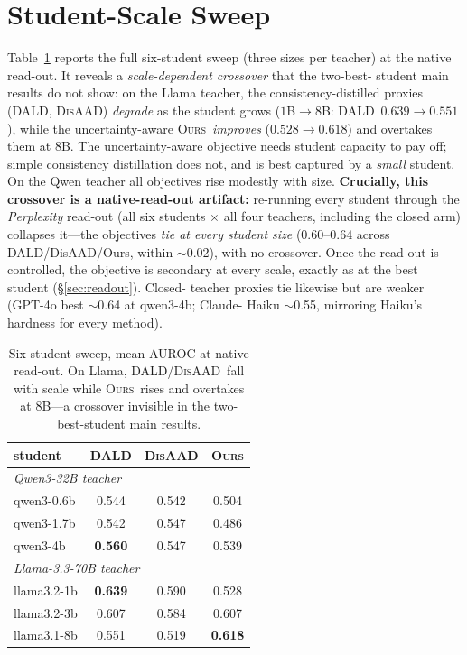 \documentclass[11pt]{article}
\newcommand{\ours}{\textsc{Ours}}
\newcommand{\dald}{\textsc{DALD}}
\newcommand{\disaad}{\textsc{DisAAD}}
\newcommand{\best}[1]{\textbf{#1}}
\begin{document}
\section{Student-Scale Sweep}\label{app:students}
Table~\ref{tab:app-students} reports the full six-student sweep (three sizes per teacher)
at the native read-out. It reveals a \emph{scale-dependent crossover} that the two-best-%
student main results do not show: on the Llama teacher, the consistency-distilled proxies
(\dald, \disaad) \emph{degrade} as the student grows ($1$B$\to$$8$B: \dald\ $0.639\to
0.551$), while the uncertainty-aware \ours\ \emph{improves} ($0.528\to0.618$) and overtakes
them at $8$B. The uncertainty-aware objective needs student capacity to pay off; simple
consistency distillation does not, and is best captured by a \emph{small} student. On the
Qwen teacher all objectives rise modestly with size. \textbf{Crucially, this crossover is a
native-read-out artifact:} re-running every student through the \emph{Perplexity} read-out
(all six students $\times$ all four teachers, including the closed arm) collapses it---the
objectives \emph{tie at every student size} ($0.60$--$0.64$ across DALD/DisAAD/Ours, within
$\sim$0.02), with no crossover. Once the read-out is controlled, the objective is
secondary at every scale, exactly as at the best student (\S\ref{sec:readout}). Closed-%
teacher proxies tie likewise but are weaker (GPT-4o best $\sim$0.64 at qwen3-4b; Claude-%
Haiku $\sim$0.55, mirroring Haiku's hardness for every method).

\begin{table}[t]\centering\small
\setlength{\tabcolsep}{6pt}
\begin{tabular}{l ccc}
\toprule
student & \dald & \disaad & \ours\\
\midrule
\multicolumn{4}{l}{\emph{Qwen3-32B teacher}}\\
qwen3-0.6b & 0.544 & 0.542 & 0.504\\
qwen3-1.7b & 0.542 & 0.547 & 0.486\\
qwen3-4b   & \best{0.560} & 0.547 & 0.539\\
\midrule
\multicolumn{4}{l}{\emph{Llama-3.3-70B teacher}}\\
llama3.2-1b & \best{0.639} & 0.590 & 0.528\\
llama3.2-3b & 0.607 & 0.584 & 0.607\\
llama3.1-8b & 0.551 & 0.519 & \best{0.618}\\
\bottomrule
\end{tabular}
\caption{Six-student sweep, mean AUROC at native read-out. On Llama, \dald/\disaad\ fall
with scale while \ours\ rises and overtakes at $8$B---a crossover invisible in the
two-best-student main results.}
\label{tab:app-students}
\end{table}
\end{document}

